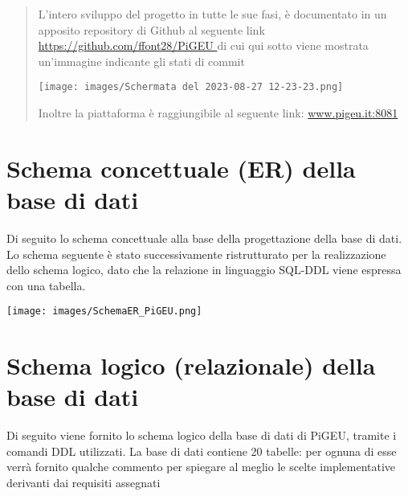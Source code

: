 \documentclass{article}
\begin{document}
\begin{abstract}
        \pagebreak

        L'intero sviluppo del progetto in tutte le sue fasi, è documentato in un apposito repository di Github al seguente link \url{https://github.com/ffont28/PiGEU } di cui qui sotto viene mostrata un'immagine indicante gli stati di commit
        \begin{center}
            \texttt{[image: images/Schermata del 2023-08-27 12-23-23.png]}
        \end{center}


        Inoltre la piattaforma è raggiungibile al seguente link: \url{www.pigeu.it:8081}
    \end{abstract}

    \pagebreak

    \tableofcontents

    \pagebreak

    \section{Schema concettuale (ER) della base di dati}
    Di seguito lo schema concettuale alla base della progettazione della base di dati.
    Lo schema seguente è stato successivamente ristrutturato per la realizzazione dello schema logico, dato che la relazione in linguaggio SQL-DDL viene espressa con una tabella.


    \texttt{[image: images/SchemaER\_PiGEU.png]}

    \pagebreak

    \section{Schema logico (relazionale) della base di dati}
    Di seguito viene fornito lo schema logico della base di dati di PiGEU, tramite i comandi DDL utilizzati. La base di dati contiene 20 tabelle: per ognuna di esse verrà fornito qualche commento per spiegare al meglio le scelte implementative derivanti dai requisiti assegnati

\end{document}
